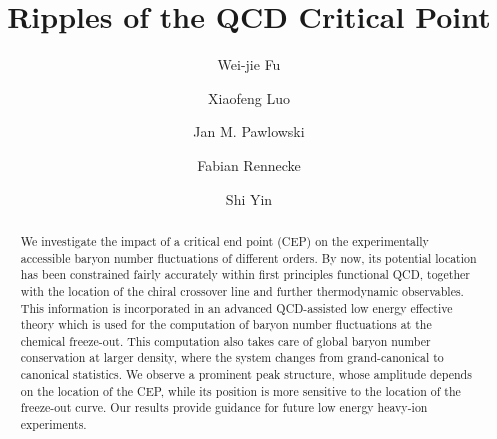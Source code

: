 \documentclass[reprint,twocolumn,superscriptaddress,preprintnumbers,amsmath,amssymb,aps,prd,floatfix]{revtex4-2}
\newcommand{\gettitle}{Ripples of the QCD Critical Point}
\begin{document}
\title{\gettitle}

\author{Wei-jie Fu}

\author{Xiaofeng Luo}
  
\author{Jan M. Pawlowski}

\author{Fabian Rennecke}

\author{Shi Yin}


\begin{abstract}

We investigate the impact of a critical end point (CEP) on the experimentally accessible baryon number fluctuations of different orders. By now, its potential location has been constrained fairly accurately within first principles functional QCD, together with the location of the chiral crossover line and further thermodynamic observables. This information is incorporated in an advanced QCD-assisted low energy effective theory which is used for the computation of baryon number fluctuations at the chemical freeze-out. This computation also takes care of global baryon number conservation at larger density, where the system changes from grand-canonical to canonical statistics. We observe a prominent peak structure, whose amplitude depends on the location of the CEP, while its position is more sensitive to the location of the freeze-out curve. Our results provide guidance for future low energy heavy-ion experiments.

\end{abstract}



\maketitle
\end{document}
